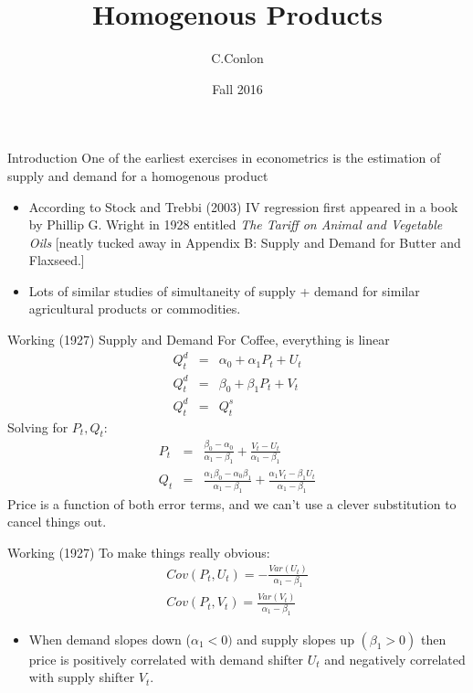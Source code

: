 \documentclass[xcolor=pdftex,dvipsnames,table,mathserif]{beamer}
\title [Homogenous Products]{Homogenous Products}
\author{C.Conlon}
\institute{Grad IO }
\date{Fall 2016}
\begin{document}
\begin{frame}
\titlepage
\end{frame}

\begin{frame}{Introduction}
One of the earliest exercises in econometrics is the estimation of supply and demand for a homogenous product
\begin{itemize}
\item According to Stock and Trebbi (2003) IV regression first appeared in a book by Phillip G. Wright in 1928 entitled \textit{The Tariff on Animal and Vegetable Oils} [neatly tucked away in Appendix B:  Supply and Demand for Butter and Flaxseed.]
\item Lots of similar studies of simultaneity of supply + demand for similar agricultural products or commodities.
\end{itemize}
\end{frame}

\begin{frame}{Working (1927)}
Supply and Demand For Coffee, everything is linear
\begin{eqnarray*}
Q_t^d &=& \alpha_0 + \alpha_1 P_t + U_t\\
Q_t^d &=& \beta_0 + \beta_1 P_t + V_t\\
Q_t^d &=& Q_t^s
\end{eqnarray*}
Solving for $P_t,Q_t$:
\begin{eqnarray*}
P_t &=& \frac{\beta_0 - \alpha_0}{\alpha_1 - \beta_1} + \frac{V_t - U_t}{\alpha_1 - \beta_1}\\
Q_t &=& \frac{\alpha_1 \beta_0 - \alpha_0 \beta_1}{\alpha_1 - \beta_1} + \frac{\alpha_1 V_t - \beta_1 U_t}{\alpha_1 - \beta_1}
\end{eqnarray*}
Price is a function of both error terms, and we can't use a clever substitution to cancel things out.
\end{frame}

\begin{frame}{Working (1927)}
To make things really obvious:
\begin{eqnarray*}
Cov(P_t,U_t) = - \frac{Var(U_t)}{\alpha_1 -\beta_1} \\
Cov(P_t,V_t) =  \frac{Var(V_t)}{\alpha_1 -\beta_1} 
\end{eqnarray*}
\begin{itemize}
\item When demand slopes down ($\alpha_1 < 0)$ and supply slopes up $(\beta_1 > 0)$ then price is positively correlated with demand shifter $U_t$ and negatively correlated with supply shifter $V_t$.
\end{itemize}
\end{frame}
\end{document}
